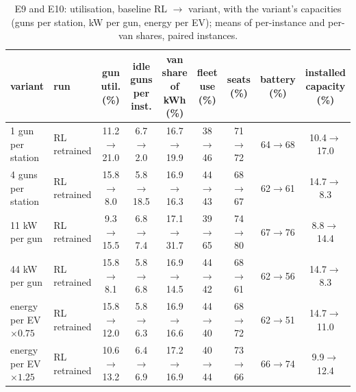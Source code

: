 \begin{table}[H]\centering
\scriptsize
\caption{E9 and E10: utilisation, baseline RL $\to$ variant, with the variant's capacities (guns per station, kW per gun, energy per EV); means of per-instance and per-van shares, paired instances.}\label{tab:utilrl}
\begin{adjustbox}{max width=\textwidth}\begin{tabular}{llccccccc}\toprule
variant & run & \shortstack{gun\\util. (\%)} & \shortstack{idle guns\\per inst.} & \shortstack{van share\\of kWh (\%)} & \shortstack{fleet\\use (\%)} & \shortstack{seats\\(\%)} & \shortstack{battery\\(\%)} & \shortstack{installed\\capacity (\%)} \\ \midrule
1 gun per station & RL retrained & 11.2$\to$21.0 & 6.7$\to$2.0 & 16.7$\to$19.9 & 38$\to$46 & 71$\to$72 & 64$\to$68 & 10.4$\to$17.0 \\
4 guns per station & RL retrained & 15.8$\to$8.0 & 5.8$\to$18.5 & 16.9$\to$16.3 & 44$\to$43 & 68$\to$67 & 62$\to$61 & 14.7$\to$8.3 \\
11 kW per gun & RL retrained & 9.3$\to$15.5 & 6.8$\to$7.4 & 17.1$\to$31.7 & 39$\to$65 & 74$\to$80 & 67$\to$76 & 8.8$\to$14.4 \\
44 kW per gun & RL retrained & 15.8$\to$8.1 & 5.8$\to$6.8 & 16.9$\to$14.5 & 44$\to$42 & 68$\to$61 & 62$\to$56 & 14.7$\to$8.3 \\
energy per EV $\times0.75$ & RL retrained & 15.8$\to$12.0 & 5.8$\to$6.3 & 16.9$\to$16.6 & 44$\to$40 & 68$\to$72 & 62$\to$51 & 14.7$\to$11.0 \\
energy per EV $\times1.25$ & RL retrained & 10.6$\to$13.2 & 6.4$\to$6.9 & 17.2$\to$16.9 & 40$\to$44 & 73$\to$66 & 66$\to$74 & 9.9$\to$12.4 \\
\bottomrule\end{tabular}\end{adjustbox}\end{table}
